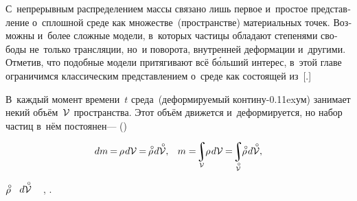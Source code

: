 \begin{otherlanguage}{russian}

С~непрерывным распределением массы связано лишь первое и~простое представление о~сплошной среде как множестве~(пространстве) материальных точек. Возможны и~более сложные модели, в~которых частицы обладают степенями свободы не~только трансляции, но~и поворота, внутренней деформации и~другими. Отметив, что подобные модели притягивают всё б\'{о}льший интерес, в~этой главе ограничимся классическим представлением о~среде как состоящей из~[.]

В~каждый момент времени~$t$ среда~(деформируемый контину\kern-0.11exум) занимает некий объём~${\mathcal{V}\hspace{.1ex}}$ пространства. Этот объём движется и~деформируется, но набор частиц в~нём постоянен\:---  ()

\nopagebreak\vspace{-0.2em}\begin{equation}\label{balanceofmass}
dm \hspace{-0.15ex} = \hspace{-0.2ex} \rho \hspace{.2ex} d\mathcal{V} \hspace{-0.1ex} = \hspace{-0.2ex} \mathcircabove{\rho} \hspace{.22ex} d\mathcircabove{\mathcal{V}} ,
\hspace{.8em}
%
m = \hspace{-0.4ex} \scalebox{0.9}{$\displaystyle\integral\displaylimits_{\mathcal{V}}$} \hspace{-0.2ex} \rho \hspace{.2ex} d\mathcal{V} \hspace{-0.1ex}
= \hspace{-0.4ex} \scalebox{0.9}{$\displaystyle\integral\displaylimits_{\mathcircabove{\mathcal{V}}}$} \hspace{-0.2ex} \mathcircabove{\rho} \hspace{.22ex} d\mathcircabove{\mathcal{V}} ,
\end{equation}

\vspace{-0.6em} \noindent {} $\mathcircabove{\rho}$ ~${d\mathcircabove{\mathcal{V}}}$\ru{\:---}  ~ , .


\end{otherlanguage}
